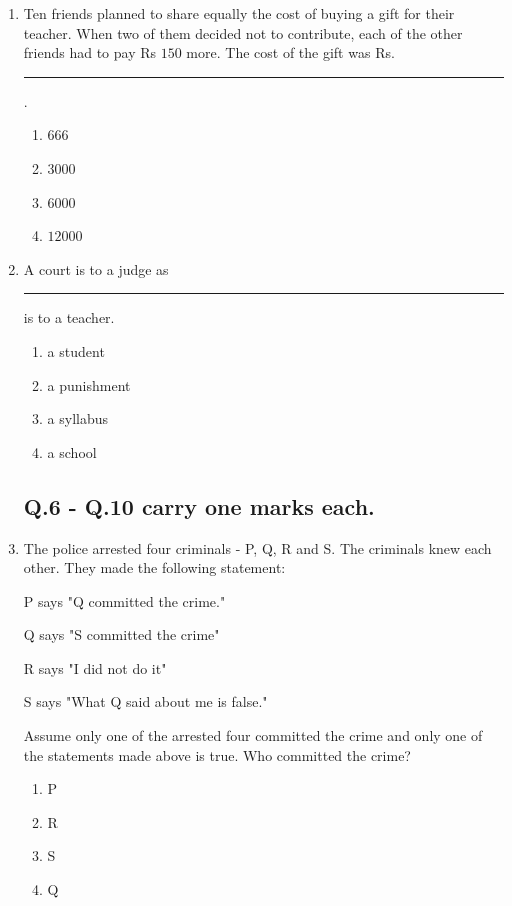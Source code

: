 \documentclass[journal]{IEEEtran}
\begin{document}
\begin{enumerate}
    \item Ten friends planned to share equally the cost of buying a gift for their teacher. When two of them decided not to contribute, each of the other friends had to pay Rs $150$ more. The cost of the gift was Rs. \rule{1cm}{0.1mm}.
\begin{multicols}{4}
    \begin{enumerate}
        \item $666$
        \item $3000$
        \item $6000$
        \item $12000$
    \end{enumerate}
\end{multicols}

    \item A court is to a judge as \rule{1.5cm}{0.1mm} is to a teacher.
\begin{multicols}{4}
    \begin{enumerate}
        \item a student
        \item a punishment
        \item a syllabus
        \item a school
    \end{enumerate}
\end{multicols}

\subsection*{\textbf{Q.6 - Q.10 carry one marks each.}}

\bigskip
    \item The police arrested four criminals - P, Q, R and S. The criminals knew each other. They made the following statement:

P says "Q committed the crime."

Q says "S committed the crime"

R says "I did not do it"

S says "What Q said about me is false."

Assume only one of the arrested four committed the crime and only one of the statements made above is true. Who committed the crime?

\begin{multicols}{4}
    \begin{enumerate}
        \item P
        \item R
        \item S
        \item Q
    \end{enumerate}
\end{multicols}


\end{enumerate}
\end{document}
